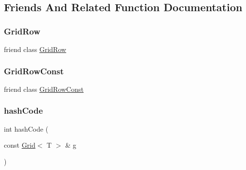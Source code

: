 \subsection{Friends And Related Function Documentation}
\mbox{\label{classGrid_a20059dcdf5d8836488337c056079f5e2}} 
\subsubsection{\texorpdfstring{Grid\+Row}{GridRow}}
{\footnotesize\ttfamily friend class \mbox{\hyperlink{classGrid_1_1GridRow}{Grid\+Row}}\hspace{0.3cm}{\ttfamily [friend]}}

\mbox{\label{classGrid_aba3ef1df6ffede859468bdcab36ab6d6}} 
\subsubsection{\texorpdfstring{Grid\+Row\+Const}{GridRowConst}}
{\footnotesize\ttfamily friend class \mbox{\hyperlink{classGrid_1_1GridRowConst}{Grid\+Row\+Const}}\hspace{0.3cm}{\ttfamily [friend]}}

\mbox{\label{classGrid_a5a2992e98747885ca3f18a81503e7b7d}} 
\subsubsection{\texorpdfstring{hash\+Code}{hashCode}}
{\footnotesize\ttfamily int hash\+Code (\begin{DoxyParamCaption}\item[{const \mbox{\hyperlink{classGrid}{Grid}}$<$ T $>$ \&}]{g }\end{DoxyParamCaption})\hspace{0.3cm}{\ttfamily [friend]}}

